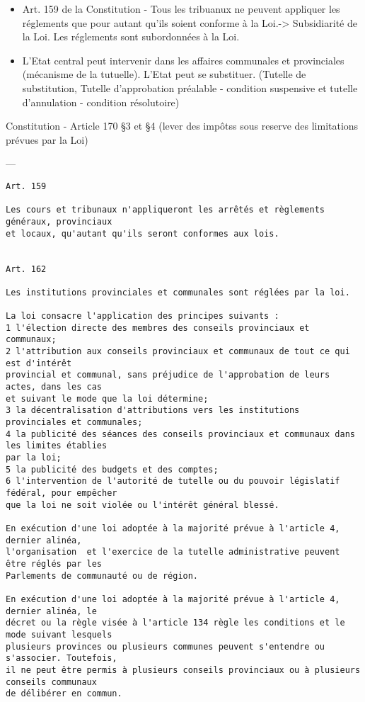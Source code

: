 \documentclass{book}
\begin{document}
\begin{itemize}
\item Art. 159 de la Constitution - Tous les tribuanux ne peuvent appliquer les réglements que pour autant qu'ils soient conforme à la Loi.-> Subsidiarité de la Loi. Les réglements sont subordonnées à la Loi.
\item L'Etat central peut intervenir dans les affaires communales et provinciales (mécanisme de la tutuelle). L'Etat peut se substituer. (Tutelle de substitution, Tutelle d'approbation préalable - condition suspensive et tutelle d'annulation - condition résolutoire)
\end{itemize}
\null
Constitution - Article 170 §3 et §4 (lever des impôtss sous reserve des limitations prévues par la Loi)

---

\begin{verbatim}
Art. 159

Les cours et tribunaux n'appliqueront les arrêtés et règlements généraux, provinciaux 
et locaux, qu'autant qu'ils seront conformes aux lois.


Art. 162

Les institutions provinciales et communales sont réglées par la loi.

La loi consacre l'application des principes suivants :
1 l'élection directe des membres des conseils provinciaux et communaux;
2 l'attribution aux conseils provinciaux et communaux de tout ce qui est d'intérêt 
provincial et communal, sans préjudice de l'approbation de leurs actes, dans les cas 
et suivant le mode que la loi détermine;
3 la décentralisation d'attributions vers les institutions provinciales et communales;
4 la publicité des séances des conseils provinciaux et communaux dans les limites établies 
par la loi;
5 la publicité des budgets et des comptes;
6 l'intervention de l'autorité de tutelle ou du pouvoir législatif fédéral, pour empêcher 
que la loi ne soit violée ou l'intérêt général blessé.

En exécution d'une loi adoptée à la majorité prévue à l'article 4, dernier alinéa, 
l'organisation  et l'exercice de la tutelle administrative peuvent être réglés par les 
Parlements de communauté ou de région.

En exécution d'une loi adoptée à la majorité prévue à l'article 4, dernier alinéa, le 
décret ou la règle visée à l'article 134 règle les conditions et le mode suivant lesquels 
plusieurs provinces ou plusieurs communes peuvent s'entendre ou s'associer. Toutefois, 
il ne peut être permis à plusieurs conseils provinciaux ou à plusieurs conseils communaux 
de délibérer en commun.


\end{verbatim}
\end{document}
